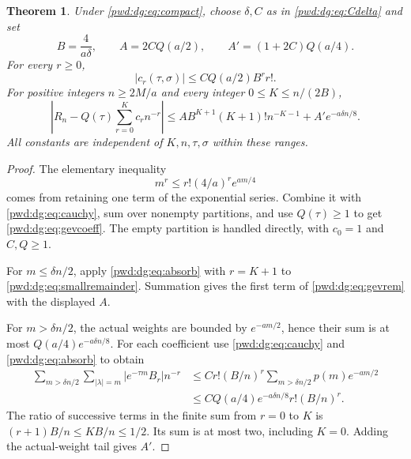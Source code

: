 \documentclass[11pt,letterpaper]{article}
\numberwithin{equation}{section}
\newtheorem{theorem}{Theorem}[section]
\theoremstyle{remark}\newtheorem{remark}[theorem]{Remark}
\begin{document}
\begin{theorem}\label{pwd:dg:thm:gevrey}
Under \eqref{pwd:dg:eq:compact}, choose $\delta,C$ as in \eqref{pwd:dg:eq:Cdelta} and set
\begin{equation}\label{pwd:dg:eq:gevconstants}
 B=\frac4{a\delta},\qquad
 A=2CQ(a/2),\qquad A'=(1+2C)Q(a/4).
\end{equation}
For every $r\ge0$,
\begin{equation}\label{pwd:dg:eq:gevcoeff}
 |c_r(\tau,\sigma)|\le CQ(a/2)B^r r!.
\end{equation}
For positive integers $n\ge2M/a$ and every integer $0\le K\le n/(2B)$,
\begin{equation}\label{pwd:dg:eq:gevrem}
 \left|R_n-Q(\tau)\sum_{r=0}^Kc_rn^{-r}\right|
 \le A B^{K+1}(K+1)!n^{-K-1}+A'e^{-a\delta n/8}.
\end{equation}
All constants are independent of $K,n,\tau,\sigma$ within these ranges.
\end{theorem}
\begin{proof}
The elementary inequality
\begin{equation}\label{pwd:dg:eq:absorb}
 m^r\le r!(4/a)^r e^{am/4}
\end{equation}
comes from retaining one term of the exponential series. Combine it with \eqref{pwd:dg:eq:cauchy}, sum over nonempty partitions, and use $Q(\tau)\ge1$ to get \eqref{pwd:dg:eq:gevcoeff}. The empty partition is handled directly, with $c_0=1$ and $C,Q\ge1$.

For $m\le\delta n/2$, apply \eqref{pwd:dg:eq:absorb} with $r=K+1$ to \eqref{pwd:dg:eq:smallremainder}. Summation gives the first term of \eqref{pwd:dg:eq:gevrem} with the displayed $A$.

For $m>\delta n/2$, the actual weights are bounded by $e^{-am/2}$, hence their sum is at most $Q(a/4)e^{-a\delta n/8}$. For each coefficient use \eqref{pwd:dg:eq:cauchy} and \eqref{pwd:dg:eq:absorb} to obtain
\begin{align*}
 \sum_{m>\delta n/2}\sum_{|\lambda|=m}|e^{-\tau m}B_r|n^{-r}
 &\le C r!(B/n)^r\sum_{m>\delta n/2}p(m)e^{-am/2}\\
 &\le C Q(a/4)e^{-a\delta n/8}r!(B/n)^r.
\end{align*}
The ratio of successive terms in the finite sum from $r=0$ to $K$ is $(r+1)B/n\le KB/n\le1/2$. Its sum is at most two, including $K=0$. Adding the actual-weight tail gives $A'$.
\end{proof}
\end{document}
